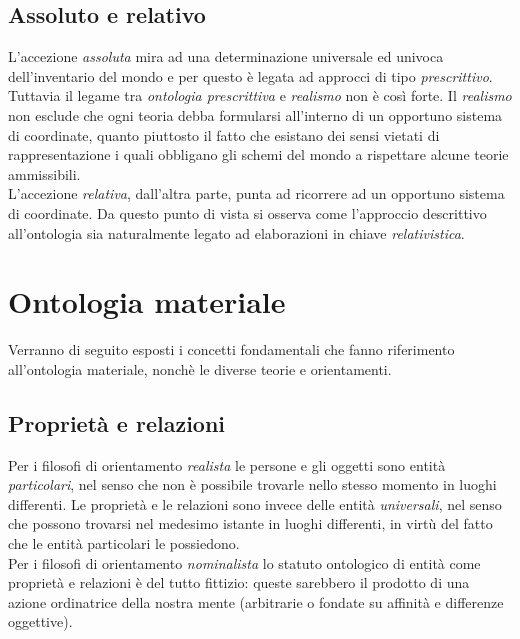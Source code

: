\documentclass[a4paper,12pt]{article}
\begin{document}
\subsection{Assoluto e relativo} %
L'accezione \textit{assoluta} mira ad una determinazione universale ed univoca dell'inventario del mondo e per questo 
è legata ad approcci di tipo \textit{prescrittivo}. Tuttavia il legame tra \textit{ontologia prescrittiva} e \textit{realismo}
non è così forte. Il \textit{realismo} non esclude che ogni teoria debba formularsi all'interno di un opportuno sistema di
coordinate, quanto piuttosto il fatto che esistano dei sensi vietati di rappresentazione i quali obbligano gli schemi del mondo 
a rispettare alcune teorie ammissibili.
\\ L'accezione \textit{relativa}, dall'altra parte, punta ad ricorrere ad un opportuno sistema di coordinate. Da questo 
punto di vista si osserva come l'approccio descrittivo all'ontologia sia naturalmente legato ad elaborazioni in chiave 
\textit{relativistica}.

\section{Ontologia materiale} %
Verranno di seguito esposti i concetti fondamentali che fanno riferimento all'ontologia materiale, nonchè
le diverse teorie e orientamenti.

\subsection{Proprietà e relazioni} %
Per i filosofi di orientamento \textit{realista} le persone e gli oggetti sono entità \textit{particolari}, nel senso che 
non è possibile trovarle nello stesso momento in luoghi differenti. Le proprietà e le relazioni sono invece delle entità
\textit{universali}, nel senso che possono trovarsi nel medesimo istante in luoghi differenti, in virtù del fatto che le
entità particolari le possiedono.
\\ Per i filosofi di orientamento \textit{nominalista} lo statuto ontologico di entità come proprietà e relazioni è del tutto 
fittizio: queste sarebbero il prodotto di una azione ordinatrice della nostra mente (arbitrarie o fondate su affinità e 
differenze oggettive).
\end{document}
